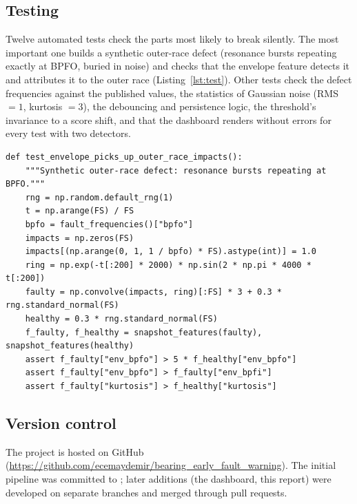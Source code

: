 \documentclass[11pt]{article}
\begin{document}
\subsection{Testing}
Twelve automated tests check the parts most likely to break silently. The most important one builds a
synthetic outer-race defect (resonance bursts repeating exactly at BPFO, buried in noise) and checks
that the envelope feature detects it and attributes it to the outer race (Listing~\ref{lst:test}).
Other tests check the defect frequencies against the published values, the statistics of Gaussian
noise (RMS $=1$, kurtosis $=3$), the debouncing and persistence logic, the threshold's invariance to a
score shift, and that the dashboard renders without errors for every test with two detectors.

\begin{lstlisting}[caption={Synthetic fault test (excerpt of \code{tests/test\_core.py}).},label=lst:test]
def test_envelope_picks_up_outer_race_impacts():
    """Synthetic outer-race defect: resonance bursts repeating at BPFO."""
    rng = np.random.default_rng(1)
    t = np.arange(FS) / FS
    bpfo = fault_frequencies()["bpfo"]
    impacts = np.zeros(FS)
    impacts[(np.arange(0, 1, 1 / bpfo) * FS).astype(int)] = 1.0
    ring = np.exp(-t[:200] * 2000) * np.sin(2 * np.pi * 4000 * t[:200])
    faulty = np.convolve(impacts, ring)[:FS] * 3 + 0.3 * rng.standard_normal(FS)
    healthy = 0.3 * rng.standard_normal(FS)
    f_faulty, f_healthy = snapshot_features(faulty), snapshot_features(healthy)
    assert f_faulty["env_bpfo"] > 5 * f_healthy["env_bpfo"]
    assert f_faulty["env_bpfo"] > f_faulty["env_bpfi"]
    assert f_faulty["kurtosis"] > f_healthy["kurtosis"]
\end{lstlisting}

\subsection{Version control}
The project is hosted on GitHub (\url{https://github.com/ecemaydemir/bearing_early_fault_warning}).
The initial pipeline was committed to ; later additions (the dashboard, this report) were
developed on separate branches and merged through pull requests.

\end{document}
